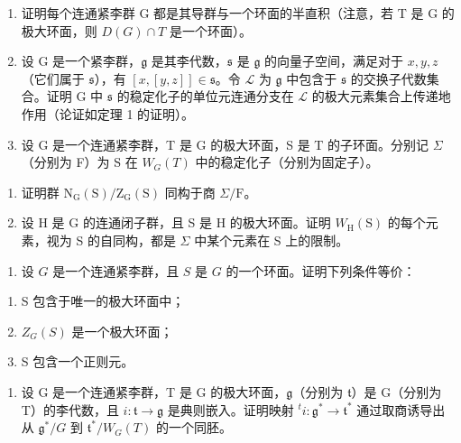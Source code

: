 \begin{enumerate}
\def\labelenumi{\arabic{enumi})}
\setcounter{enumi}{1}
\item
  证明每个连通紧李群 G 都是其导群与一个环面的半直积（注意，若 T 是 G 的极大环面，则 \(D(G) \cap T\) 是一个环面）。
\item
  设 G 是一个紧李群，\(\mathfrak{g}\) 是其李代数，\(\mathfrak{s}\) 是 \(\mathfrak{g}\) 的向量子空间，满足对于 \(x, y, z\)（它们属于 \(\mathfrak{s}\)），有 \([x, [y, z]] \in \mathfrak{s}\)。令 \(\mathcal{L}\) 为 \(\mathfrak{g}\) 中包含于 \(\mathfrak{s}\) 的交换子代数集合。证明 G 中 \(\mathfrak{s}\) 的稳定化子的单位元连通分支在 \(\mathcal{L}\) 的极大元素集合上传递地作用（论证如定理 1 的证明）。
\item
  设 G 是一个连通紧李群，T 是 G 的极大环面，S 是 T 的子环面。分别记 \(\Sigma\)（分别为 F）为 S 在 \(W_{G}(T)\) 中的稳定化子（分别为固定子）。
\end{enumerate}

\begin{enumerate}
\def\labelenumi{\alph{enumi})}
\item
  证明群 \(\mathrm{N_G(S) / Z_G(S)}\) 同构于商 \(\Sigma /\mathrm{F}\)。
\item
  设 H 是 G 的连通闭子群，且 S 是 H 的极大环面。证明 \(W_{\mathrm{H}}(\mathrm{S})\) 的每个元素，视为 S 的自同构，都是 \(\Sigma\) 中某个元素在 S 上的限制。
\end{enumerate}

\begin{enumerate}
\def\labelenumi{\arabic{enumi})}
\setcounter{enumi}{4}
\tightlist
\item
  设 \(G\) 是一个连通紧李群，且 \(S\) 是 \(G\) 的一个环面。证明下列条件等价：
\end{enumerate}

\begin{enumerate}
\def\labelenumi{(\roman{enumi})}
\item
  S 包含于唯一的极大环面中；
\item
  \(Z_{G}(S)\) 是一个极大环面；
\item
  S 包含一个正则元。
\end{enumerate}

\begin{enumerate}
\def\labelenumi{\arabic{enumi})}
\setcounter{enumi}{5}
\tightlist
\item
  设 G 是一个连通紧李群，T 是 G 的极大环面，\(\mathfrak{g}\)（分别为 \(\mathfrak{t}\)）是 G（分别为 T）的李代数，且 \(i : \mathfrak{t} \to \mathfrak{g}\) 是典则嵌入。证明映射 \(^{t}i : \mathfrak{g}^{*} \to \mathfrak{t}^{*}\) 通过取商诱导出从 \(\mathfrak{g}^{*}/G\) 到 \(\mathfrak{t}^{*}/W_{G}(T)\) 的一个同胚。
\end{enumerate}


